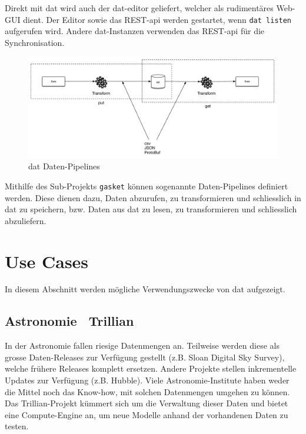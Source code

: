 Direkt mit dat wird auch der dat-editor geliefert, welcher als rudimentäres Web-GUI dient. Der Editor sowie das REST-\acs{api} werden gestartet, wenn \texttt{dat listen} aufgerufen wird. Andere dat-Instanzen verwenden das REST-\acs{api} für die Synchronisation.
\begin{figure}[H]
  \centering
  \includegraphics[width=\linewidth,clip]{fig/dat-pipeline}
  \caption{dat Daten-Pipelines}
  \label{fig:dat-architecture-pipeline}
\end{figure}

Mithilfe des Sub-Projekts \texttt{gasket} können sogenannte Daten-Pipelines definiert werden. Diese dienen dazu, Daten abzurufen, zu transformieren und schliesslich in dat zu speichern, bzw. Daten aus dat zu lesen, zu transformieren und schliesslich abzuliefern.

\section{Use Cases}
In diesem Abschnitt werden mögliche Verwendungszwecke von \gls{dat} aufgezeigt.

\subsection{Astronomie \textendash\ Trillian} 
In der Astronomie fallen riesige Datenmengen an. Teilweise werden diese als grosse Daten-Releases zur Verfügung gestellt (z.B. Sloan Digital Sky Survey), welche frühere Releases komplett ersetzen. Andere Projekte stellen inkrementelle Updates zur Verfügung (z.B. Hubble). Viele Astronomie-Institute haben weder die Mittel noch das Know-how, mit solchen Datenmengen umgehen zu können. Das Trillian-Projekt kümmert sich um die Verwaltung dieser Daten und bietet eine Compute-Engine an, um neue Modelle anhand der vorhandenen Daten zu testen.

